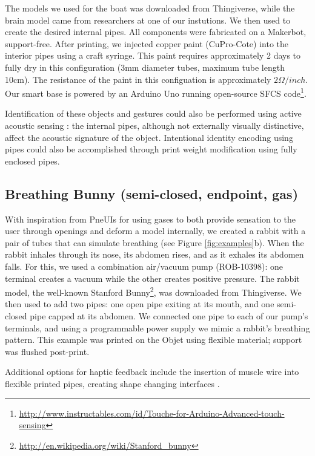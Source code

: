 The models we used for the boat was downloaded from Thingiverse, while the brain model came from researchers at one of our instutions. We then used \systemname to create the desired internal pipes. All components were fabricated on a Makerbot, support-free.  After printing, we injected copper paint (CuPro-Cote) into the interior pipes using a craft syringe.  This paint requires approximately 2 days to fully dry in this configuration (3mm diameter tubes, maximum tube length 10cm).  The resistance of the paint in this configuation is approximately $2\Omega / inch.$  Our smart base is powered by an Arduino Uno running open-source SFCS code\footnote{\url{http://www.instructables.com/id/Touche-for-Arduino-Advanced-touch-sensing}}.

Identification of these objects and gestures could also be performed using active acoustic sensing \cite{Ono-touchandactivate}: the internal pipes, although not externally visually distinctive, affect the acoustic signature of the object.  Intentional identity encoding using pipes could also be accomplished through print weight modification using fully enclosed pipes.

\subsection{Breathing Bunny (semi-closed, endpoint, gas)}

With inspiration from PneUIs \cite{Yao-pneui} for using gases to both provide sensation to the user through openings and deform a model internally, we created a rabbit with a pair of tubes that can simulate breathing (see Figure \ref{fig:examples}b).  When the rabbit inhales through its nose, its abdomen rises, and as it exhales its abdomen falls.  For this, we used a combination air/vacuum pump (ROB-10398): one terminal creates a vacuum while the other creates positive pressure.  
The rabbit model, the well-known Stanford Bunny\footnote{\url{http://en.wikipedia.org/wiki/Stanford_bunny}}, was downloaded from Thingiverse. We then used \systemname to add two pipes: one open pipe exiting at its mouth, and one semi-closed pipe capped at its abdomen.  We connected one pipe to each of our pump's terminals, and using a programmable power supply we mimic a rabbit's breathing pattern.  This example was printed on the Objet using flexible material; support was flushed post-print.

Additional options for haptic feedback include the insertion of muscle wire into flexible printed pipes, creating shape changing interfaces \cite{Coelho-shapechanging}.

